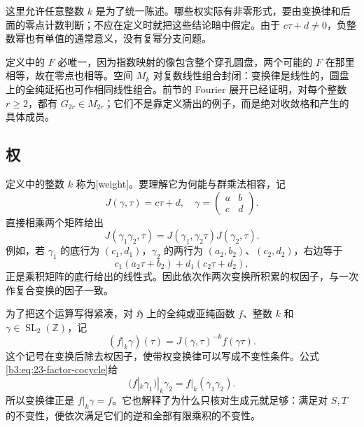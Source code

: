 这里允许任意整数 \(k\) 是为了统一陈述。哪些权实际有非零形式，要由变换律和后面的零点计数判断；不应在定义时就把这些结论暗中假定。由于 \(c\tau+d\ne0\)，负整数幂也有单值的通常意义，没有复幂分支问题。

定义中的 \(F\) 必唯一，因为指数映射的像包含整个穿孔圆盘，两个可能的 \(F\) 在那里相等，故在零点也相等。空间 \(M_k\) 对复数线性组合封闭：变换律是线性的，圆盘上的全纯延拓也可作相同线性组合。前节的 Fourier 展开已经证明，对每个整数 \(r\ge2\)，都有 \(G_{2r}\in M_{2r}\)；它们不是靠定义猜出的例子，而是绝对收敛格和产生的具体成员。

\subsection{权}
\label{b3:subsec:230302}

定义中的整数 \(k\) 称为[weight]。要理解它为何能与群乘法相容，记
\[
 J(\gamma,\tau)=c\tau+d,
 \quad \gamma=\begin{pmatrix}a&b\\c&d\end{pmatrix}.
\]
直接相乘两个矩阵给出
\begin{equation}\label{b3:eq:23-factor-cocycle}
 J(\gamma_1\gamma_2,\tau)
 =J(\gamma_1,\gamma_2\tau)J(\gamma_2,\tau).
\end{equation}
例如，若 \(\gamma_1\) 的底行为 \((c_1,d_1)\)，\(\gamma_2\) 的两行为 \((a_2,b_2)\)、\((c_2,d_2)\)，右边等于
\[
 c_1(a_2\tau+b_2)+d_1(c_2\tau+d_2),
\]
正是乘积矩阵的底行给出的线性式。因此依次作两次变换所积累的权因子，与一次作复合变换的因子一致。

为了把这个运算写得紧凑，对 \(\mathfrak H\) 上的全纯或亚纯函数 \(f\)、整数 \(k\) 和 \(\gamma\in\operatorname{SL}_2(\mathbb Z)\)，记
\[
 (f|_k\gamma)(\tau)
 =J(\gamma,\tau)^{-k}f(\gamma\tau).
\]
这个记号在变换后除去权因子，使带权变换律可以写成不变性条件。公式\eqref{b3:eq:23-factor-cocycle}给
\[
 (f|_k\gamma_1)|_k\gamma_2=f|_k(\gamma_1\gamma_2).
\]
所以变换律正是 \(f|_k\gamma=f\)。它也解释了为什么只核对生成元就足够：满足对 \(S,T\) 的不变性，便依次满足它们的逆和全部有限乘积的不变性。


